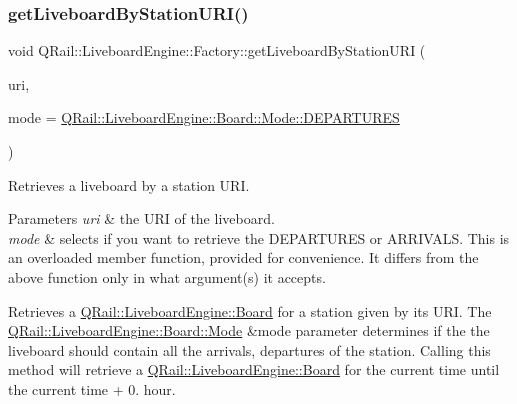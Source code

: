 \subsubsection{\texorpdfstring{getLiveboardByStationURI()}{getLiveboardByStationURI()}\hspace{0.1cm}{\footnotesize\ttfamily [1/2]}}
{\footnotesize\ttfamily void Q\+Rail\+::\+Liveboard\+Engine\+::\+Factory\+::get\+Liveboard\+By\+Station\+U\+RI (\begin{DoxyParamCaption}\item[{const Q\+Url \&}]{uri,  }\item[{const \mbox{\hyperlink{classQRail_1_1LiveboardEngine_1_1Board_a0ab6d318f405895f62c6e98cb2d86c6e}{Q\+Rail\+::\+Liveboard\+Engine\+::\+Board\+::\+Mode}} \&}]{mode = {\ttfamily \mbox{\hyperlink{classQRail_1_1LiveboardEngine_1_1Board_a0ab6d318f405895f62c6e98cb2d86c6ea560e6dfa758a32c703224545b841a386}{Q\+Rail\+::\+Liveboard\+Engine\+::\+Board\+::\+Mode\+::\+D\+E\+P\+A\+R\+T\+U\+R\+ES}}} }\end{DoxyParamCaption})}



Retrieves a liveboard by a station U\+RI. 


\begin{DoxyParams}{Parameters}
{\em uri} & the U\+RI of the liveboard. \\
\hline
{\em mode} & selects if you want to retrieve the D\+E\+P\+A\+R\+T\+U\+R\+ES or A\+R\+R\+I\+V\+A\+LS. This is an overloaded member function, provided for convenience. It differs from the above function only in what argument(s) it accepts.\\
\hline
\end{DoxyParams}
Retrieves a \mbox{\hyperlink{classQRail_1_1LiveboardEngine_1_1Board}{Q\+Rail\+::\+Liveboard\+Engine\+::\+Board}} for a station given by it\textquotesingle{}s U\+RI. The \mbox{\hyperlink{classQRail_1_1LiveboardEngine_1_1Board_a0ab6d318f405895f62c6e98cb2d86c6e}{Q\+Rail\+::\+Liveboard\+Engine\+::\+Board\+::\+Mode}} \&mode parameter determines if the the liveboard should contain all the arrivals, departures of the station. Calling this method will retrieve a \mbox{\hyperlink{classQRail_1_1LiveboardEngine_1_1Board}{Q\+Rail\+::\+Liveboard\+Engine\+::\+Board}} for the current time until the current time + 0. hour. \mbox{\label{classQRail_1_1LiveboardEngine_1_1Factory_a3fc799d424334fe21be54a3cba0853be}} 
